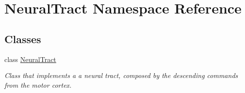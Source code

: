 \hypertarget{namespace_neural_tract}{}\section{Neural\+Tract Namespace Reference}
\label{namespace_neural_tract}
\subsection*{Classes}
\begin{DoxyCompactItemize}
\item 
class \hyperlink{class_neural_tract_1_1_neural_tract}{Neural\+Tract}
\begin{DoxyCompactList}\small\item\em Class that implements a a neural tract, composed by the descending commands from the motor cortex. \end{DoxyCompactList}\end{DoxyCompactItemize}
